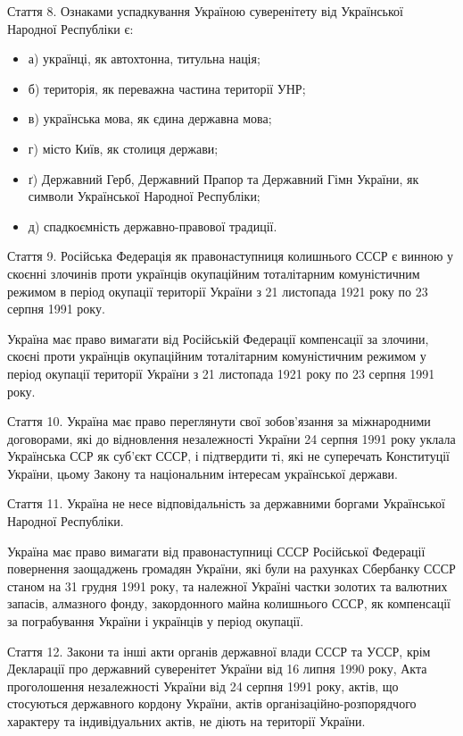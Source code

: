 Стаття 8. Ознаками успадкування Україною суверенітету від Української Народної
Республіки є:

\begin{itemize}
  \item а) українці, як автохтонна, титульна нація;
  \item б) територія, як переважна частина території УНР;
  \item в) українська мова, як єдина державна мова;
  \item г) місто Київ, як столиця держави;
  \item ґ) Державний Герб, Державний Прапор та Державний Гімн України, як символи Української Народної Республіки;
  \item д) спадкоємність державно-правової традиції.
\end{itemize}

Стаття 9. Російська Федерація як правонаступниця колишнього СССР є винною у
скоєнні злочинів проти українців окупаційним тоталітарним комуністичним режимом
в період окупації території України з 21 листопада 1921 року по 23 серпня 1991
року.

Україна має право вимагати від Російській Федерації компенсації за злочини,
скоєні проти українців окупаційним тоталітарним комуністичним режимом у період
окупації території України з 21 листопада 1921 року по 23 серпня 1991 року.

Стаття 10. Україна має право переглянути свої зобов’язання за міжнародними
договорами, які до відновлення незалежності України 24 серпня 1991 року уклала
Українська ССР як суб’єкт СССР, і підтвердити ті, які не суперечать Конституції
України, цьому Закону та національним інтересам української держави.

Стаття 11. Україна не несе відповідальність за державними боргами Української Народної Республіки.

Україна має право вимагати від правонаступниці СССР Російської Федерації
повернення заощаджень громадян України, які були на рахунках Сбербанку СССР
станом на 31 грудня 1991 року, та належної Україні частки золотих та валютних
запасів, алмазного фонду, закордонного майна колишнього СССР, як компенсації за
пограбування України і українців у період окупації.

Стаття 12. Закони та інші акти органів державної влади СССР та УССР, крім
Декларації про державний суверенітет України від 16 липня 1990 року, Акта
проголошення незалежності України від 24 серпня 1991 року, актів, що стосуються
державного кордону України, актів організаційно-розпорядчого характеру та
індивідуальних актів, не діють на території України.

